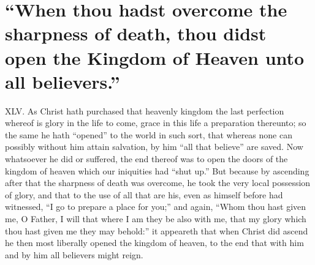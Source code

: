 \section*{“When thou hadst overcome the sharpness of death, thou didst open the Kingdom of Heaven unto all believers.”}
XLV. As Christ hath purchased that heavenly kingdom the last perfection whereof is glory in the life to come, grace in this life a preparation thereunto; so the same he hath “opened” to the world in such sort, that whereas none can possibly without him attain salvation, by him “all that believe” are saved. Now whatsoever he did or suffered, the end thereof was to open the doors of the kingdom of heaven which our iniquities had “shut up.” But because by ascending  after that the sharpness of death was overcome, he took the very local possession of glory, and that to the use of all that are his, even as himself before had witnessed, “I go to prepare a place for you;” and again, “Whom thou hast given me, O Father, I will that where I am they be also with me, that my glory which thou hast given me they may behold:” it appeareth that when Christ did ascend he then most liberally opened the kingdom of heaven, to the end that with him and by him all believers might reign.
